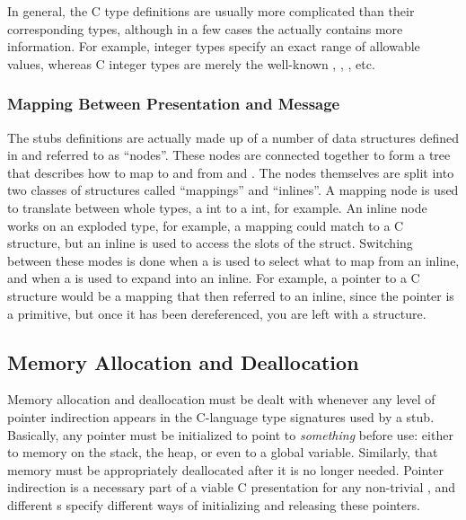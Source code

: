 In general, the C type definitions are usually more complicated than their
corresponding \MINT{} types, although in a few cases the \MINT{} actually
contains more information.  For example, \MINT{} integer types specify an exact
range of allowable values, whereas C integer types are merely the well-known
, , , etc.

\subsubsection{Mapping Between Presentation and Message}

The stubs definitions are actually made up of a number of data structures
defined in  and referred to as ``nodes''.  These nodes are
connected together to form a tree that describes how to map to and from \CAST{}
and \MINT{}\@.  The nodes themselves are split into two classes of structures
called ``mappings'' and ``inlines''.  A mapping node is used to translate
between whole types, a \CAST{} int to a \MINT{} int, for example.  An inline
node works on an exploded type, for example, a mapping could match to a C
structure, but an inline is used to access the slots of the struct.  Switching
between these modes is done when a  is used to
select what to map from an inline, and when a
 is used to expand into an inline.  For
example, a pointer to a C structure would be a mapping that then referred to an
inline, since the pointer is a primitive, but once it has been dereferenced,
you are left with a structure.



\subsection{Memory Allocation and Deallocation}
\label{subsec:PRESC:Memory Allocation and Deallocation}

Memory allocation and deallocation must be dealt with whenever any level of
pointer indirection appears in the C-language type signatures used by a stub.
Basically, any pointer must be initialized to point to \emph{something} before
use: either to memory on the stack, the heap, or even to a global variable.
Similarly, that memory must be appropriately deallocated after it is no longer
needed.  Pointer indirection is a necessary part of a viable C presentation for
any non-trivial \IDL{}, and different \IDL{}s specify different ways of
initializing and releasing these pointers.

